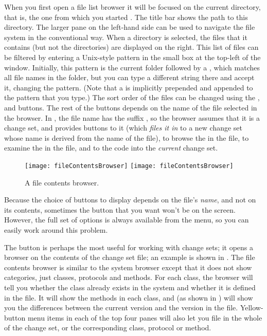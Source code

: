 \documentclass[a4paper,10pt,twoside]{book}
\begin{document}
When you first open a file list browser it will be focused on the current directory, that is, the one from which you started \sq.
The title bar shows the path to this directory.
The larger pane on the left-hand side can be used to navigate the file system in the conventional way.
When a directory is selected, the files that it contains (but not the directories) are displayed on the right.
This list of files can be filtered by entering a Unix-style pattern in the small box at the top-left of the window.
Initially, this pattern is the current folder followed by a \ct{*}, which matches all file names in the folder, but you can type a different string there and accept it, changing the pattern.
(Note that a \ct{*} is implicitly prepended and appended to the pattern that you type.)
The sort order of the files can be changed using the ,  and  buttons.
The rest of the buttons depends on the name of the file selected in the browser.
In , the file name has the suffix , so the browser assumes that it is a change set, and provides buttons to  it (which \textit{files it in} to a new change set whose name is derived from the name of the file), to browse the  in the file, to examine the  in the file, and to  the code into the \emph{current} change set.

\begin{figure}[btp]
	\begin{center}
	\ifluluelse
		{\texttt{[image: fileContentsBrowser]}}
		{\texttt{[image: fileContentsBrowser]}}
	\end{center}
	\caption{A file contents browser.}
	\label{fig:fileContentsBrowser}
\end{figure}

Because the choice of buttons to display depends on the file's \emph{name}, and not on its contents, sometimes the button that you want won't be on the screen.
However, the full set of options is always available from the   menu, so you can easily work around this problem.

The  button is perhaps the most useful for working with change sets; it opens a browser on the contents of the change set file; an example is shown in .
The file contents browser is similar to the system browser except that it does not show categories, just classes, protocols and methods.
For each class, the browser will tell you whether the class already exists in the system and whether it is defined in the file.
It will show the methods in each class, and (as shown in ) will show you the differences between the current version and the version in the file.
Yellow-button menu items in each of the top four panes will also let you file in the whole of the change set, or the corresponding class, protocol or method.
\end{document}
